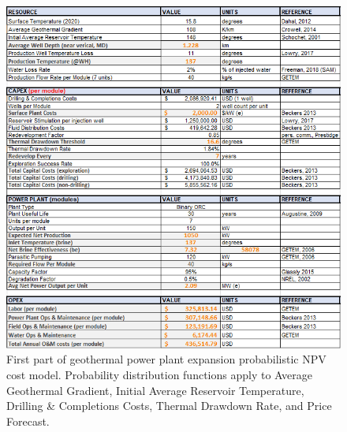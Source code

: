 \begin{figure}[H]
\centering
\includegraphics[width=\textwidth]{templates/images/Figure-Flexible_Model_SheetA.png}
\caption[Probabilistic cost model worksheet (part 1)]{First part of geothermal power plant expansion probabilistic NPV cost model. Probability distribution functions apply to Average Geothermal Gradient, Initial Average Reservoir Temperature, Drilling \& Completions Costs, Thermal Drawdown Rate, and Price Forecast.}
\label{fig:probabilistic_model_sheet1}
\end{figure}

